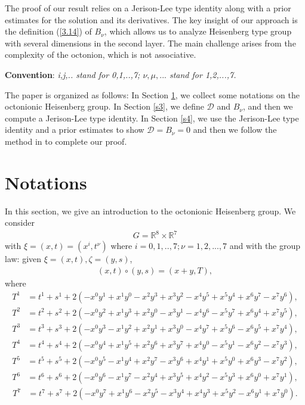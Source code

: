 \documentclass[reqno,12pt]{amsart}
\numberwithin{equation}{section}
\theoremstyle{plain}
\theoremstyle{definition}
\begin{document}
 The proof of our result relies on a Jerison-Lee type identity along with a  prior estimates for the solution and its derivatives. The key insight of our approach is the definition (\ref{3.14}) of $B_\nu$, which allows us to analyze Heisenberg type group with several dimensions in the second layer. The main challenge arises from the complexity of the octonion, which is not associative. 
 
\textbf{Convention}: \textit{i,j,.. stand for 0,1,..,7; $\nu,\mu,...$ stand for 1,2,...,7.}


 
 The paper is organized as follows: In Section \ref{s2}, we collect some notations on the octonionic Heisenberg group. In Section \ref{s3}, we define $\mathcal{D}$ and $B_\nu$, and then we compute a Jerison-Lee type identity. In Section \ref{s4}, we use the Jerison-Lee type identity and a prior estimates to show $\mathcal{D}=B_\nu= 0$ and then we follow the method in \cite{IMV2014} to complete our proof.

 
\section{Notations}\label{s2}
In this section, we give an introduction to the octonionic Heisenberg group. We consider
\begin{align*}
    G=\mathbb{R}^{8}\times \mathbb{R}^7
\end{align*}
with $\xi=(x,t)=(x^i, t^\nu)$ where $ i=0,1,..,7; \nu=1,2,...,7$ and with the group law: given $\xi=(x,t),\zeta=(y,s)$,
\begin{align*}
    (x,t)\circ(y,s)=(x+y,T),
\end{align*}
where 
\small{
\begin{align*}
    T^1&=t^1+s^1+2(-x^0 y^1+x^1 y^0-x^2 y^3+x^3 y^2-x^4y^5+x^5 y^4+x^6 y^7-x^7 y^6),
\end{align*}
\begin{align*}
    T^2&=t^2+s^2+2(-x^0 y^2+x^1 y^3+x^2 y^0-x^3y^1-x^4y^6-x^5 y^7+x^6 y^4+x^7 y^5),
\end{align*}
\begin{align*}
    T^3&=t^3+s^3+2(-x^0 y^3-x^1 y^2+x^2 y^1+x^3 y^0-x^4y^7+x^5 y^6-x^6 y^5+x^7 y^4),
\end{align*}
\begin{align*}
    T^4&=t^4+s^4+2(-x^0 y^4+x^1 y^5+x^2 y^6+x^3 y^7+x^4 y^0-x^5 y^1-x^6 y^2-x^7 y^3),
\end{align*}
\begin{align*}
    T^5&=t^5+s^5+2(-x^0 y^5-x^1 y^4+x^2 y^7-x^3y^6+x^4y^1+x^5 y^0+x^6 y^3-x^7 y^2),
\end{align*}
\begin{align*}
    T^6&=t^6+s^6+2(-x^0 y^6-x^1 y^7-x^2 y^4+x^3 y^5+x^4y^2-x^5 y^3+x^6 y^0+x^7 y^1),
\end{align*}
\begin{align*}
    T^7&=t^7+s^7+2(-x^0 y^7+x^1 y^6-x^2 y^5-x^3y^4+x^4y^3+x^5 y^2-x^6 y^1+x^7 y^0).
\end{align*}}
\end{document}
